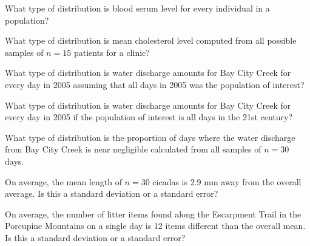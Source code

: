 \documentclass[10pt,openany]{book}\usepackage[]{graphicx}\usepackage[]{color}
\begin{document}
\begin{exsection}
  \item \label{revex:SamplingDistBS} What type of distribution is blood serum level for every individual in a population? 
  \item \label{revex:SamplingDistCL} What type of distribution is mean cholesterol level computed from all possible samples of $n=15$ patients for a clinic?  
  \item \label{revex:SamplingDistWD1} What type of distribution is water discharge amounts for Bay City Creek for every day in 2005 assuming that all days in 2005 was the population of interest? 
  \item \label{revex:SamplingDistWD2} What type of distribution is water discharge amounts for Bay City Creek for every day in 2005 if the population of interest is all days in the 21st century? 
  \item \label{revex:SamplingDistWD3} What type of distribution is the proportion of days where the water discharge from Bay City Creek is near negligible calculated from all samples of $n=30$ days. 
  \item \label{revex:SamplingDistC} On average, the mean length of $n=30$ cicadas is 2.9 mm away from the overall average. Is this a standard deviation or a standard error? 
  \item \label{revex:SamplingDistET} On average, the number of litter items found along the Escarpment Trail in the Porcupine Mountains on a single day is 12 items different than the overall mean. Is this a standard deviation or a standard error? 


\end{exsection}
\end{document}

